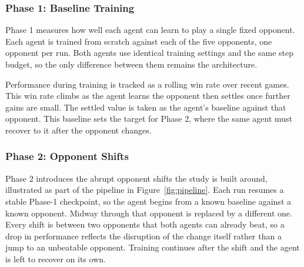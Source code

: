 \documentclass[sigconf,nonacm]{acmart}
\begin{document}
\subsubsection{Phase 1: Baseline Training}
Phase 1 measures how well each agent can learn to play a single fixed opponent.
Each agent is trained from scratch against each of the five opponents, one
opponent per run. Both agents use identical training settings and the same step budget, so the only difference between them remains the
architecture.

Performance during training is tracked as a rolling win rate over recent games.
This win rate climbs as the agent learns the opponent then settles once further
gains are small. The settled value is taken as the agent's baseline against that
opponent. This baseline sets the target for Phase 2, where the same agent must
recover to it after the opponent changes.


          
          

\subsubsection{Phase 2: Opponent Shifts}
Phase 2 introduces the abrupt opponent shifts the study is built around, illustrated as part of the pipeline in Figure~\ref{fig:pipeline}. Each run resumes a stable
Phase-1 checkpoint, so the agent begins from a known baseline against a known
opponent. Midway through that opponent is replaced by a different one. Every
shift is between two opponents that both agents can already beat, so a drop in
performance reflects the disruption of the change itself rather than a jump to an
unbeatable opponent. Training continues after the shift and the agent is left to
recover on its own.
\end{document}
